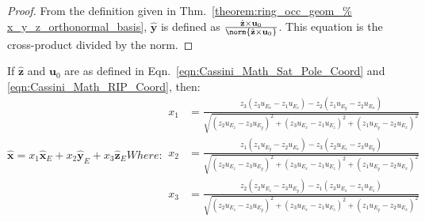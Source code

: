 \documentclass[crop=false,class=book,oneside]{standalone}
\begin{document}
        \begin{proof}
            From the definition given in
            Thm.~\ref{theorem:ring_occ_geom_%
                      x_y_z_orthonormal_basis},
            $\hat{\mathbf{y}}$ is defined as
            $\frac{\hat{\mathbf{z}}\times\mathbf{u}_{0}}%
                  {\norm{\hat{\mathbf{z}}\times\mathbf{u}_{0}}}$.
            This equation is the
            cross-product divided by the norm.
        \end{proof}
        \begin{theorem}
            If $\hat{\mathbf{z}}$ and
            $\mathbf{u}_{0}$ are as defined in
            Eqn.~\ref{eqn:Cassini_Math_Sat_Pole_Coord}
            and \ref{eqn:Cassini_Math_RIP_Coord}, then:
            \begin{subequations}
                \begin{equation}
                    \hat{\mathbf{x}}=
                        x_{1}\hat{\mathbf{x}}_{E}+
                        x_{2}\hat{\mathbf{y}}_{E}+
                        x_{3}\hat{\mathbf{z}}_{E}
                \end{equation}
                Where:
                \begin{align}
                    x_1
                    &=\frac{z_{3}(z_{3}u_{E_{x}}-z_{1}u_{E_{z}})-
                            z_{2}(z_{1}u_{E_{y}}-z_{2}u_{E_{x}})}
                           {\sqrt{(z_{2}u_{E_{z}}-z_{3}u_{E_{y}})^{2}+
                            (z_{3}u_{E_{x}}-z_{1}u_{E_{z}})^{2}+
                            (z_{1}u_{E_{y}}-z_{2}u_{E_{x}})^{2}}}\\
                    x_2
                    &=\frac{z_{1}(z_{1}u_{E_{y}}-
                            z_{2}u_{E_{x}})-z_{3}(z_{2}u_{E_{z}}-
                            z_{3}u_{E_{y}})}
                           {\sqrt{(z_{2}u_{E_{z}}-z_{3}u_{E_{y}})^{2}+
                            (z_{3}u_{E_{x}}-z_{1}u_{E_{z}})^{2}+
                            (z_{1}u_{E_{y}}-z_{2}u_{E_{x}})^{2}}}\\
                    x_3
                    &=\frac{z_{2}(z_{2}u_{E_{z}}-
                            z_{3}u_{E_{y}})-z_{1}(z_{3}u_{E_{x}}-
                            z_{1}u_{E_{z}})}
                           {\sqrt{(z_{2}u_{E_{z}}-z_{3}u_{E_{y}})^{2}+
                            (z_{3}u_{E_{x}}-z_{1}u_{E_{z}})^{2}+
                            (z_{1}u_{E_{y}}-z_{2}u_{E_{x}})^{2}}}
                \end{align}
            \end{subequations}
            \end{theorem}
\end{document}
